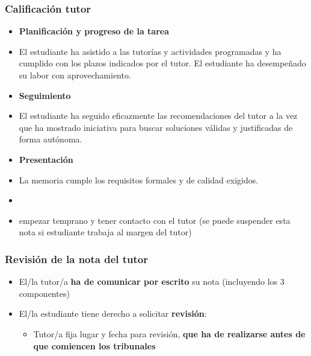 \documentclass[aspectratio=43]{beamer}
\begin{document}
\begin{frame}
\frametitle{Calificación tutor}
\centering

\begin{itemize}
  \item \textbf{Planificación y progreso de la tarea}
  \item[] {\small El estudiante ha asistido a las tutorías y actividades programadas y ha cumplido con los plazos indicados por el tutor. El estudiante ha desempeñado su labor con aprovechamiento.}
  \item \textbf{Seguimiento}
  \item[] {\small El estudiante ha seguido eficazmente las recomendaciones del tutor a la vez que ha mostrado iniciativa para buscar soluciones válidas y justificadas de forma autónoma.}
  \item \textbf{Presentación}
  \item[] {\small La memoria cumple los requisitos formales y de calidad exigidos.}
  \item[]
  \item {} empezar temprano y tener contacto con el tutor (se puede suspender esta nota si estudiante trabaja al margen del tutor)
\end{itemize}

\end{frame}

\begin{frame}
\frametitle{Revisión de la nota del tutor}
\centering

\begin{itemize}
  \item El/la tutor/a \textbf{ha de comunicar por escrito} su nota (incluyendo los 3 componentes)
  \item El/la estudiante tiene derecho a solicitar \textbf{revisión}:
  \begin{itemize}
    \item Tutor/a fija lugar y fecha para revisión, \textbf{que ha de realizarse antes de que comiencen los tribunales}
  \end{itemize}
\end{itemize}

\end{frame}
\end{document}
